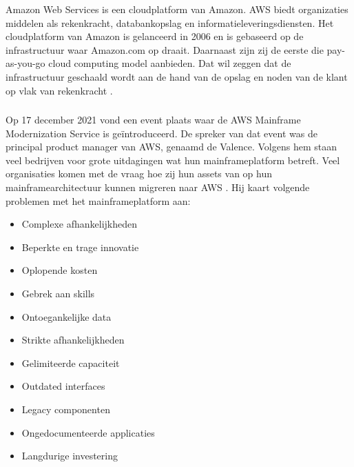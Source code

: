 Amazon Web Services is een cloudplatform van Amazon. AWS biedt organizaties middelen als rekenkracht, databankopslag en informatieleveringsdiensten. Het cloudplatform van Amazon is gelanceerd in 2006 en is gebaseerd op de infrastructuur waar Amazon.com op draait. Daarnaast zijn zij de eerste die pay-as-you-go cloud computing model aanbieden. Dat wil zeggen dat de infrastructuur geschaald wordt aan de hand van de opslag en noden van de klant op vlak van rekenkracht \autocite{Gillis2020}.

\subsubsection{}
\label{sec:AWS Mainframe Modernization Service }

Op 17 december 2021 vond een event plaats waar de AWS Mainframe Modernization Service is geïntroduceerd. De spreker van dat event was de principal product manager van AWS, genaamd de Valence. Volgens hem staan veel bedrijven voor grote uitdagingen wat hun mainframeplatform betreft. Veel organisaties komen met de vraag hoe zij hun assets van op hun mainframearchitectuur kunnen migreren naar AWS \autocite{Valence2021}. Hij kaart volgende problemen met het mainframeplatform aan: 
 \begin{itemize}
    \item Complexe afhankelijkheden
    \item Beperkte en trage innovatie
    \item Oplopende kosten
    \item Gebrek aan skills
    \item Ontoegankelijke data
    \item Strikte afhankelijkheden
    \item Gelimiteerde capaciteit
    \item Outdated interfaces 
    \item Legacy componenten
    \item Ongedocumenteerde applicaties 
    \item Langdurige investering 
\end{itemize}


